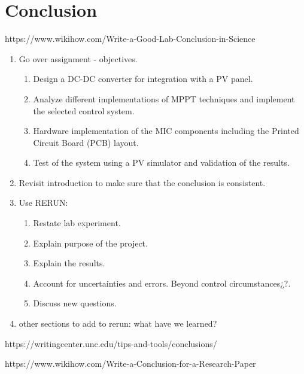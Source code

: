 \chapter{Conclusion}\label{ch:conclusion}

https://www.wikihow.com/Write-a-Good-Lab-Conclusion-in-Science
\begin{enumerate}
	\item Go over assignment - objectives.  
	\begin{enumerate}
		\item Design a DC-DC converter for integration with a PV panel.
		\item Analyze different implementations of MPPT techniques and implement the selected control system. 
		\item Hardware implementation of the MIC components including the Printed Circuit Board (PCB) layout.
		\item Test of the system using a PV simulator and validation of the results. 
	\end{enumerate}
	\item Revisit introduction to make sure that the conclusion is consistent.
	\item Use RERUN:
	\begin{enumerate}
		\item Restate lab experiment.
		\item Explain purpose of the project.
		\item Explain the results.
		\item Account for uncertainties and errors. Beyond control circumstances¿?.
		\item Discuss new questions.
	\end{enumerate}
	\item other sections to add to rerun: what have we learned?
\end{enumerate}


https://writingcenter.unc.edu/tips-and-tools/conclusions/

https://www.wikihow.com/Write-a-Conclusion-for-a-Research-Paper